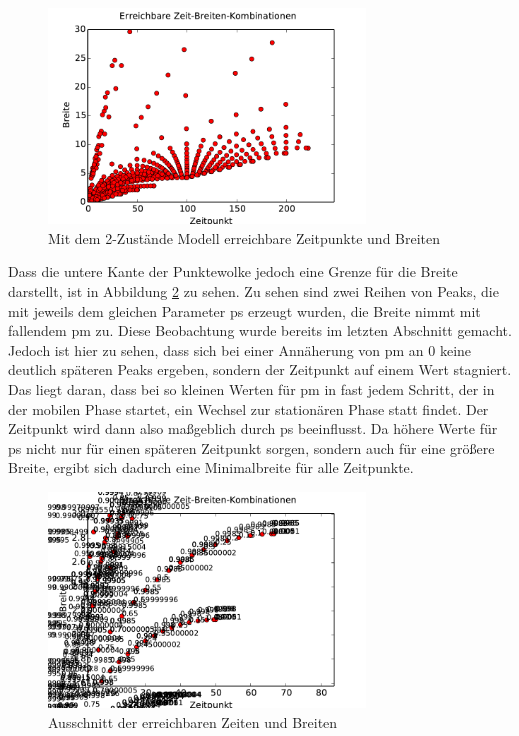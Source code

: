 \begin{figure}[h]
\centering
\includegraphics[width=0.75\textwidth]{bilder/2s_zeitbreiten_ohnep}
\caption{Mit dem 2-Zustände Modell erreichbare Zeitpunkte und Breiten}
\label{Grenzen_2p_ohnep}
\end{figure}

Dass die untere Kante der Punktewolke jedoch eine Grenze für die Breite darstellt, ist in Abbildung \ref{Grenzen_2p_ausschnitt} zu sehen. Zu sehen sind zwei Reihen von Peaks, die mit jeweils dem gleichen Parameter ps erzeugt wurden, die Breite nimmt mit fallendem pm zu. Diese Beobachtung wurde bereits im letzten Abschnitt gemacht. Jedoch ist hier zu sehen, dass sich bei einer Annäherung von pm an $0$ keine deutlich späteren Peaks ergeben, sondern der Zeitpunkt auf einem Wert stagniert. Das liegt daran, dass bei so kleinen Werten für pm in fast jedem Schritt, der in der mobilen Phase startet, ein Wechsel zur stationären Phase statt findet. Der Zeitpunkt wird dann also maßgeblich durch ps beeinflusst. Da höhere Werte für ps nicht nur für einen späteren Zeitpunkt sorgen, sondern auch für eine größere Breite, ergibt sich dadurch eine Minimalbreite für alle Zeitpunkte.

\begin{figure}[h]
\centering
\includegraphics[width=0.75\textwidth]{bilder/2s_zeitbreiten_ausschnitt.pdf}
\caption{Ausschnitt der erreichbaren Zeiten und Breiten}
\label{Grenzen_2p_ausschnitt}
\end{figure}

